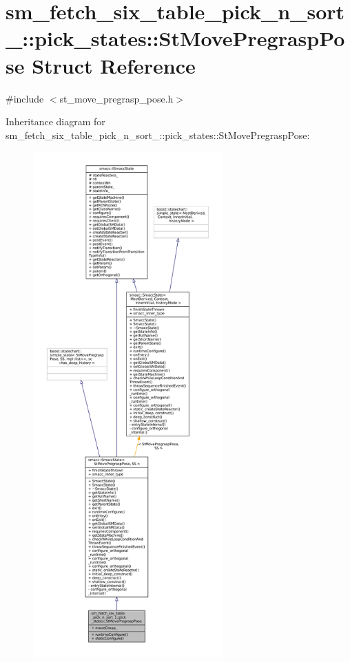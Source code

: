 \hypertarget{structsm__fetch__six__table__pick__n__sort__1_1_1pick__states_1_1StMovePregraspPose}{}\section{sm\+\_\+fetch\+\_\+six\+\_\+table\+\_\+pick\+\_\+n\+\_\+sort\+\_\+:\+:pick\+\_\+states\+:\+:St\+Move\+Pregrasp\+Pose Struct Reference}
\label{structsm__fetch__six__table__pick__n__sort__1_1_1pick__states_1_1StMovePregraspPose}


{\ttfamily \#include $<$st\+\_\+move\+\_\+pregrasp\+\_\+pose.\+h$>$}



Inheritance diagram for sm\+\_\+fetch\+\_\+six\+\_\+table\+\_\+pick\+\_\+n\+\_\+sort\+\_\+:\+:pick\+\_\+states\+:\+:St\+Move\+Pregrasp\+Pose\+:
\nopagebreak
\begin{figure}[H]
\begin{center}
\leavevmode
\includegraphics[height=550pt]{structsm__fetch__six__table__pick__n__sort__1_1_1pick__states_1_1StMovePregraspPose__inherit__graph}
\end{center}
\end{figure}


